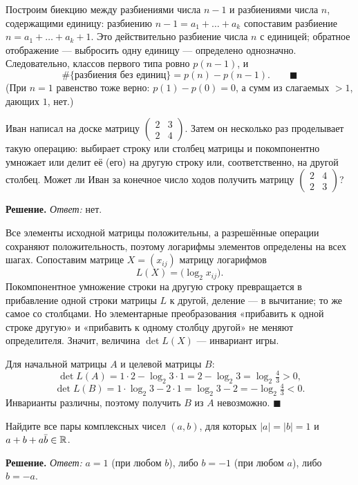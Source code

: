 Построим биекцию между разбиениями числа $n-1$ и разбиениями числа $n$, содержащими единицу: разбиению $n-1=a_1+\dots+a_k$ сопоставим разбиение $n=a_1+\dots+a_k+1$. Это действительно разбиение числа $n$ с единицей; обратное отображение --- выбросить одну единицу --- определено однозначно. Следовательно, классов первого типа ровно $p(n-1)$, и
\[
\#\{\text{разбиения без единиц}\}=p(n)-p(n-1). \qquad \blacksquare
\]
(При $n=1$ равенство тоже верно: $p(1)-p(0)=0$, а сумм из слагаемых $>1$, дающих $1$, нет.)
\fi

\q Иван написал на доске матрицу $\begin{pmatrix} 2 & 3\\ 2 & 4\end{pmatrix}$. Затем он несколько раз проделывает такую операцию: выбирает строку или столбец матрицы и покомпонентно умножает или делит её (его) на другую строку или, соответственно, на другой столбец. Может ли Иван за конечное число ходов получить матрицу $\begin{pmatrix} 2 & 4\\ 2 & 3\end{pmatrix}$?

\if{}
\textbf{Решение.} \emph{Ответ:} нет.

Все элементы исходной матрицы положительны, а разрешённые операции сохраняют положительность, поэтому логарифмы элементов определены на всех шагах. Сопоставим матрице $X=(x_{ij})$ матрицу логарифмов
\[
L(X)=\bigl(\log_2 x_{ij}\bigr).
\]
Покомпонентное умножение строки на другую строку превращается в прибавление одной строки матрицы $L$ к другой, деление --- в вычитание; то же самое со столбцами. Но элементарные преобразования «прибавить к одной строке другую» и «прибавить к одному столбцу другой» не меняют определителя. Значит, величина $\det L(X)$ --- инвариант игры.

Для начальной матрицы $A$ и целевой матрицы $B$:
\[
\det L(A)=1\cdot 2-\log_2 3\cdot 1=2-\log_2 3=\log_2\tfrac43>0,
\]
\[
\det L(B)=1\cdot\log_2 3-2\cdot 1=\log_2 3-2=-\log_2\tfrac43<0 .
\]
Инварианты различны, поэтому получить $B$ из $A$ невозможно. \hfill$\blacksquare$
\fi

\q Найдите все пары комплексных чисел $(a,b)$, для которых $|a|=|b|=1$ и $a+b+a\bar b\in\mathbb{R}$.

\if{}
\textbf{Решение.} \emph{Ответ:} $a=1$ (при любом $b$), либо $b=-1$ (при любом $a$), либо $b=-a$.

